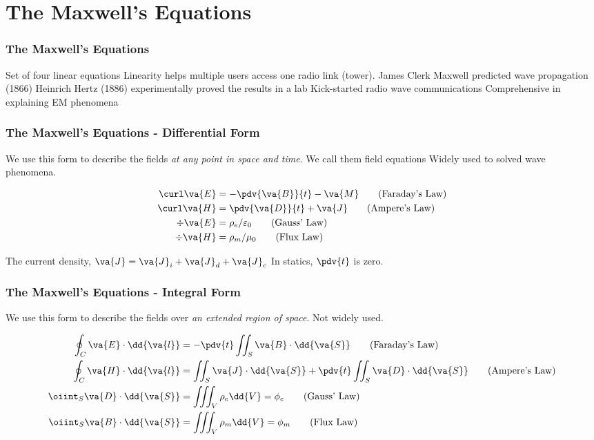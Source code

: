 \documentclass[10pt, compress]{beamer}
\newcommand{\E}{\varepsilon}  %
\renewcommand{\u}{\mu}  %
\newcommand{\p}{\rho}  %
\begin{document}
\section{The Maxwell's Equations}
\begin{frame}
    \frametitle{The Maxwell's Equations}
    \begin{outline}
      \1 Set of four linear equations
      \2 Linearity helps multiple users access one radio link (tower).
      \1 James Clerk Maxwell predicted wave propagation (1866)
      \1 Heinrich Hertz (1886) experimentally proved the results in a lab
      \1 Kick-started radio wave communications
      \1 Comprehensive in explaining EM phenomena
    \end{outline}
\end{frame}
\begin{frame}
  \frametitle{The Maxwell's Equations - Differential Form}
  \begin{outline}
    \1 We use this form to describe the fields \textit{at any point in space and time}.
    \1 We call them field equations
    \1 Widely used to solved wave phenomena.
  \end{outline}
  \begin{align*}
\curl \va{E} &= - \pdv{\va{B}}{t} - \va{M} \tag{Faraday's Law}\\
\curl \va{H} &= \pdv{\va{D}}{t} + \va{J} \tag{Ampere's Law} \\
\div \va{E} &= \rho_e/\E_0 \tag{Gauss' Law}\\
\div \va{H} &= \rho_m/\u_0 \tag{Flux Law}
\end{align*}
\begin{outline}
  \1 The current density, $\va{J} = \va{J}_i + \va{J}_d + \va{J}_c$
  \1 In statics, $\pdv{t}$ is zero.
\end{outline}
\end{frame}
\begin{frame}
  \frametitle{The Maxwell's Equations - Integral Form}
  \begin{outline}
    \1 We use this form to describe the fields over \textit{an extended region of space}.
    \1 Not widely used.
  \end{outline}
  \begin{align*}
  \oint_{C} \va{E} \cdot \dd{\va{l}}  &= -\pdv{t} \iint_{S} \va{B} \cdot \dd{\va{S}} \tag{Faraday's Law} \\
  \oint_{C} \va{H} \cdot \dd{\va{l}}  &= \iint_{S} \va{J} \cdot \dd{\va{S}}  + \pdv{t} \iint_{S} \va{D} \cdot \dd{\va{S}} \tag{Ampere's Law}\\
  \oiint_{S} \va{D} \cdot \dd{\va{S}} &= \iiint_{V} \p_e \dd{V}
  = \phi_e \tag{Gauss' Law} \\
  \oiint_{S} \va{B} \cdot \dd{\va{S}}  &= \iiint_{V} \p_m \dd{V}
  = \phi_m \tag{Flux Law}
\end{align*}
\end{frame}
\end{document}
